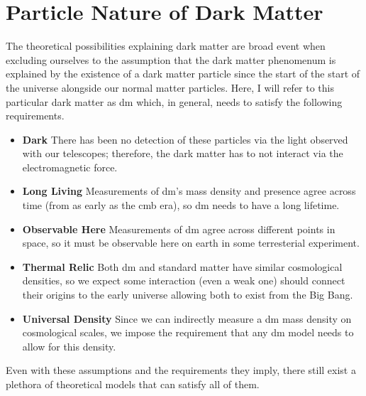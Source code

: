 \section{Particle Nature of Dark Matter}
The theoretical possibilities explaining dark matter are broad \cite{darksectors-2016}
event when excluding ourselves to the assumption that the dark matter phenomenum is explained
by the existence of a dark matter particle since the start of the start of the universe alongside
our normal matter particles. Here, I will refer to this particular dark matter
as \gls{dm} which, in general, needs to satisfy the following requirements.
\begin{itemize}
    \item \textbf{Dark} There has been no detection of these particles via the light observed with our telescopes;
          therefore, the dark matter has to not interact via the electromagnetic force.
    \item \textbf{Long Living} Measurements of \gls{dm}'s mass density and presence agree across time
          (from as early as the \gls{cmb} era), so \gls{dm} needs to have a long lifetime.
    \item \textbf{Observable Here} Measurements of \gls{dm} agree across different points in space,
          so it must be observable here on earth in some terresterial experiment.
    \item \textbf{Thermal Relic} Both \gls{dm} and standard matter have similar
          cosmological densities, so we expect some interaction (even a weak one) should connect their
          origins to the early universe allowing both to exist from the Big Bang.
    \item \textbf{Universal Density} Since we can indirectly measure a \gls{dm} mass density on
          cosmological scales, we impose the requirement that any \gls{dm} model needs to allow for
          this density.
\end{itemize}
Even with these assumptions and the requirements they imply, there still exist a plethora of
theoretical models that can satisfy all of them.

